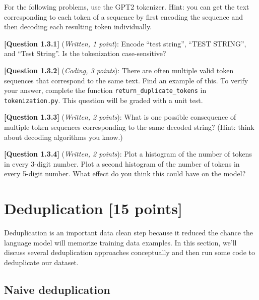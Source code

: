 \documentclass[leqno,12pt]{article}
\begin{document}
For the following problems, use the GPT2 tokenizer. Hint: you can get the text corresponding to each token of a sequence by first encoding the sequence and then decoding each resulting token individually.

\noindent \textbf{[Question 1.3.1]} (\emph{Written, 1 point}): Encode ``test string'', ``TEST STRING'', and ``Test String''. Is the tokenization case-sensitive? 
\begin{tcolorbox}[fit,height=1cm, width=\linewidth, blank, borderline={1pt}{-2pt}]
\end{tcolorbox}

\noindent \textbf{[Question 1.3.2]} (\emph{Coding, 3 points}): There are often multiple valid token sequences that correspond to the same text. Find an example of this. To verify your answer, complete the function \texttt{return\_duplicate\_tokens} in \texttt{tokenization.py}. This question will be graded with a unit test. 

\noindent \textbf{[Question 1.3.3]} (\emph{Written, 2 points}): What is one possible consequence of multiple token sequences corresponding to the same decoded string? (Hint: think about decoding algorithms you know.) 
\begin{tcolorbox}[fit,height=3cm, width=\linewidth, blank, borderline={1pt}{-2pt}]
\end{tcolorbox}

\noindent \textbf{[Question 1.3.4]} (\emph{Written, 2 points}): Plot a histogram of the number of tokens in every 3-digit number. Plot a second histogram of the number of tokens in every 5-digit number. What effect do you think this could have on the model? 
\begin{tcolorbox}[fit,height=5cm, width=\linewidth, blank, borderline={1pt}{-2pt}]
\end{tcolorbox}

\section{Deduplication [15 points]}
\noindent
Deduplication is an important data clean step because it reduced the chance the language model will memorize training data examples.
In this section, we'll discuss several deduplication approaches conceptually and then run some code to deduplicate our dataset.
\subsection{Naive deduplication}
\end{document}
